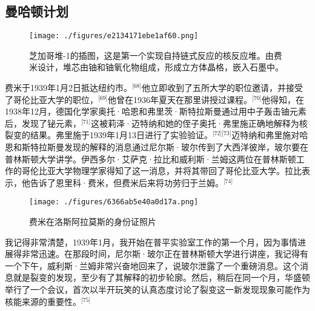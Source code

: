 \subsection{曼哈顿计划}
\begin{figure}[ht]
\centering
\texttt{[image: ./figures/e2134171ebe1af60.png]}
\caption{芝加哥堆-1的插图，这是第一个实现自持链式反应的核反应堆。由费米设计，堆芯由铀和铀氧化物组成，形成立方体晶格，嵌入石墨中。} \label{fig_ELK_7}
\end{figure}
费米于1939年1月2日抵达纽约市。\(^\text{[68]}\)他立即收到了五所大学的职位邀请，并接受了哥伦比亚大学的职位，\(^\text{[69]}\)他曾在1936年夏天在那里讲授过课程。\(^\text{[70]}\)他得知，在1938年12月，德国化学家奥托·哈恩和弗里茨·斯特拉斯曼通过用中子轰击铀元素后，发现了铋元素，\(^\text{[71]}\)这被莉泽·迈特纳和她的侄子奥托·弗里施正确地解释为核裂变的结果。弗里施于1939年1月13日进行了实验验证。\(^\text{[72][73]}\)迈特纳和弗里施对哈恩和斯特拉斯曼发现的解释的消息通过尼尔斯·玻尔传到了大西洋彼岸，玻尔要在普林斯顿大学讲学。伊西多尔·艾萨克·拉比和威利斯·兰姆这两位在普林斯顿工作的哥伦比亚大学物理学家得知了这一消息，并将其带回了哥伦比亚大学。拉比表示，他告诉了恩里科·费米，但费米后来将功劳归于兰姆。\(^\text{[74]}\)
\begin{figure}[ht]
\centering
\texttt{[image: ./figures/6366ab5e40a0d17a.png]}
\caption{费米在洛斯阿拉莫斯的身份证照片} \label{fig_ELK_8}
\end{figure}
我记得非常清楚，1939年1月，我开始在普平实验室工作的第一个月，因为事情进展得非常迅速。在那段时间，尼尔斯·玻尔正在普林斯顿大学进行讲座，我记得有一个下午，威利斯·兰姆非常兴奋地回来了，说玻尔泄露了一个重磅消息。这个消息就是裂变的发现，至少有了其解释的初步轮廓。然后，稍后在同一个月，华盛顿举行了一个会议，首次以半开玩笑的认真态度讨论了裂变这一新发现现象可能作为核能来源的重要性。\(^\text{[75]}\)

